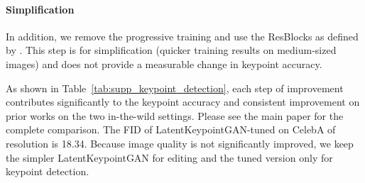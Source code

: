 \documentclass[10pt, conference, compsocconf]{IEEEtran}
\begin{document}
\paragraph{Simplification} In addition, we remove the progressive training \cite{karras2018progressive} and use the ResBlocks as defined by \cite{park2019semantic}. This step is for simplification (quicker training results on medium-sized images) and does not provide a measurable change in keypoint accuracy.

As shown in Table~\ref{tab:supp_keypoint_detection}, each step of improvement contributes significantly to the keypoint accuracy and consistent improvement on prior works on the two in-the-wild settings. Please see the main paper for the complete comparison. The FID of LatentKeypointGAN-tuned on CelebA of resolution  is 18.34. Because image quality is not significantly improved, we keep the simpler LatentKeypointGAN for editing and the tuned version only for keypoint detection.
\end{document}
